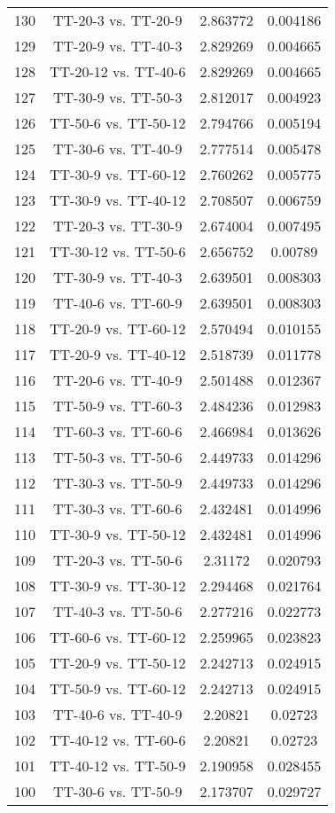 \documentclass[a4paper,10pt]{article}
\begin{document}
\begin{landscape}
\begin{table}[!htp]
\begin{tabular}{cccc}
130&TT-20-3 vs. TT-20-9&2.863772&0.004186\\
129&TT-20-9 vs. TT-40-3&2.829269&0.004665\\
128&TT-20-12 vs. TT-40-6&2.829269&0.004665\\
127&TT-30-9 vs. TT-50-3&2.812017&0.004923\\
126&TT-50-6 vs. TT-50-12&2.794766&0.005194\\
125&TT-30-6 vs. TT-40-9&2.777514&0.005478\\
124&TT-30-9 vs. TT-60-12&2.760262&0.005775\\
123&TT-30-9 vs. TT-40-12&2.708507&0.006759\\
122&TT-20-3 vs. TT-30-9&2.674004&0.007495\\
121&TT-30-12 vs. TT-50-6&2.656752&0.00789\\
120&TT-30-9 vs. TT-40-3&2.639501&0.008303\\
119&TT-40-6 vs. TT-60-9&2.639501&0.008303\\
118&TT-20-9 vs. TT-60-12&2.570494&0.010155\\
117&TT-20-9 vs. TT-40-12&2.518739&0.011778\\
116&TT-20-6 vs. TT-40-9&2.501488&0.012367\\
115&TT-50-9 vs. TT-60-3&2.484236&0.012983\\
114&TT-60-3 vs. TT-60-6&2.466984&0.013626\\
113&TT-50-3 vs. TT-50-6&2.449733&0.014296\\
112&TT-30-3 vs. TT-50-9&2.449733&0.014296\\
111&TT-30-3 vs. TT-60-6&2.432481&0.014996\\
110&TT-30-9 vs. TT-50-12&2.432481&0.014996\\
109&TT-20-3 vs. TT-50-6&2.31172&0.020793\\
108&TT-30-9 vs. TT-30-12&2.294468&0.021764\\
107&TT-40-3 vs. TT-50-6&2.277216&0.022773\\
106&TT-60-6 vs. TT-60-12&2.259965&0.023823\\
105&TT-20-9 vs. TT-50-12&2.242713&0.024915\\
104&TT-50-9 vs. TT-60-12&2.242713&0.024915\\
103&TT-40-6 vs. TT-40-9&2.20821&0.02723\\
102&TT-40-12 vs. TT-60-6&2.20821&0.02723\\
101&TT-40-12 vs. TT-50-9&2.190958&0.028455\\
100&TT-30-6 vs. TT-50-9&2.173707&0.029727\\

\end{tabular}
\end{table}
\end{landscape}
\end{document}
